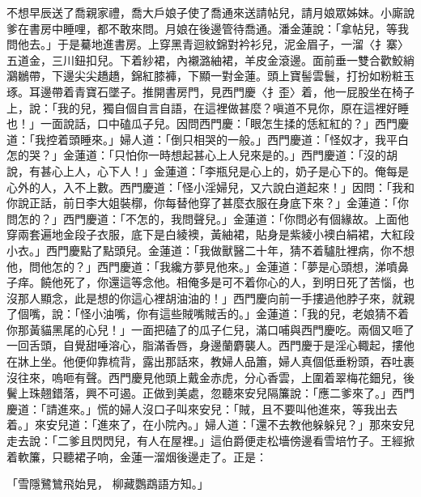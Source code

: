 不想早辰送了喬親家禮，喬大戶娘子使了喬通來送請帖兒，請月娘眾姊妹。小廝說爹在書房中睡哩，都不敢來問。月娘在後邊管待喬通。潘金蓮說：「拿帖兒，等我問他去。」于是驀地進書房。上穿黑青迴紋錦對衿衫兒，泥金眉子，一溜〈扌寨〉五道金，三川鈕扣兒。下着紗裙，內襯潞紬裙，羊皮金滾邊。面前垂一雙合歡鮫綃鸂鶒帶，下邊尖尖趫趫，錦紅膝褲，下顯一對金蓮。頭上寶髻雲鬟，打扮如粉粧玉琢。耳邊帶着青寶石墜子。推開書房門，見西門慶〈扌歪〉着，他一屁股坐在椅子上，說：「我的兒，獨自個自言自語，在這裡做甚麼？嗔道不見你，原在這裡好睡也！」一面說話，口中磕瓜子兒。因問西門慶：「眼怎生揉的恁紅紅的？」西門慶道：「我控着頭睡來。」婦人道：「倒只相哭的一般。」西門慶道：「怪奴才，我平白怎的哭？」金蓮道：「只怕你一時想起甚心上人兒來是的。」西門慶道：「沒的胡說，有甚心上人，心下人！」金蓮道：「李瓶兒是心上的，奶子是心下的。俺每是心外的人，入不上數。西門慶道：「怪小淫婦兒，又六說白道起來！」因問：「我和你說正話，前日李大姐裝槨，你每替他穿了甚麼衣服在身底下來？」金蓮道：「你問怎的？」西門慶道：「不怎的，我問聲兒。」金蓮道：「你問必有個緣故。上面他穿兩套遍地金段子衣服，底下是白綾襖，黃紬裙，貼身是紫綾小襖白絹裙，大紅段小衣。」西門慶點了點頭兒。金蓮道：「我做獸醫二十年，猜不着驢肚裡病，你不想他，問他怎的？」西門慶道：「我纔方夢見他來。」金蓮道：「夢是心頭想，涕噴鼻子痒。饒他死了，你還這等念他。相俺多是可不着你心的人，到明日死了苦惱，也沒那人顯念，此是想的你這心裡胡油油的！」西門慶向前一手摟過他脖子來，就親了個嘴，說：「怪小油嘴，你有這些賊嘴賊舌的。」金蓮道：「我的兒，老娘猜不着你那黃貓黑尾的心兒！」一面把磕了的瓜子仁兒，滿口哺與西門慶吃。兩個又咂了一回舌頭，自覺甜唾溶心，脂滿香唇，身邊蘭麝襲人。西門慶于是淫心輙起，摟他在牀上坐。他便仰靠梳背，露出那話來，教婦人品簫，婦人真個低垂粉頭，吞吐裹沒往來，嗚咂有聲。西門慶見他頭上戴金赤虎，分心香雲，上圍着翠梅花鈿兒，後鬢上珠翹錯落，興不可遏。正做到美處，忽聽來安兒隔簾說：「應二爹來了。」西門慶道：「請進來。」慌的婦人沒口子叫來安兒：「賊，且不要叫他進來，等我出去着。」來安兒道：「進來了，在小院內。」婦人道：「還不去教他躲躲兒？」那來安兒走去說：「二爹且閃閃兒，有人在屋裡。」這伯爵便走松墻傍邊看雪培竹子。王經掀着軟簾，只聽裙子响，金蓮一溜烟後邊走了。正是：

「雪隱鷺鷥飛始見，  柳藏鸚鵡語方知。」

